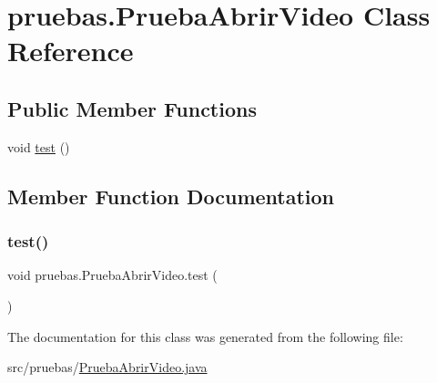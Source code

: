 \hypertarget{classpruebas_1_1_prueba_abrir_video}{}\section{pruebas.\+Prueba\+Abrir\+Video Class Reference}
\label{classpruebas_1_1_prueba_abrir_video}
\subsection*{Public Member Functions}
\begin{DoxyCompactItemize}
\item 
void \hyperlink{classpruebas_1_1_prueba_abrir_video_a7ca9ad600ff0c4b3f8f76df47a4695ea}{test} ()
\end{DoxyCompactItemize}


\subsection{Member Function Documentation}
\hypertarget{classpruebas_1_1_prueba_abrir_video_a7ca9ad600ff0c4b3f8f76df47a4695ea}{}\label{classpruebas_1_1_prueba_abrir_video_a7ca9ad600ff0c4b3f8f76df47a4695ea} 
\subsubsection{\texorpdfstring{test()}{test()}}
{\footnotesize\ttfamily void pruebas.\+Prueba\+Abrir\+Video.\+test (\begin{DoxyParamCaption}{ }\end{DoxyParamCaption})}



The documentation for this class was generated from the following file\+:\begin{DoxyCompactItemize}
\item 
src/pruebas/\hyperlink{_prueba_abrir_video_8java}{Prueba\+Abrir\+Video.\+java}\end{DoxyCompactItemize}
